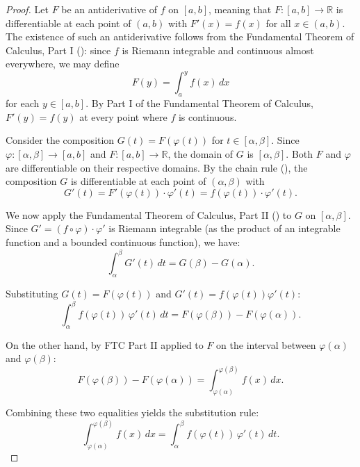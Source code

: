 \begin{proof}
    Let $F$ be an antiderivative of $f$ on $[a, b]$, meaning that $F : [a, b] \to \mathbb{R}$ is differentiable at each point of $(a, b)$ with $F'(x) = f(x)$ for all $x \in (a, b)$. The existence of such an antiderivative follows from the Fundamental Theorem of Calculus, Part I (): since $f$ is Riemann integrable and continuous almost everywhere, we may define
    $$F(y) = \int_a^y f(x)\,dx$$
    for each $y \in [a, b]$. By Part I of the Fundamental Theorem of Calculus, $F'(y) = f(y)$ at every point where $f$ is continuous.

    Consider the composition $G(t) = F(\varphi(t))$ for $t \in [\alpha, \beta]$. Since $\varphi : [\alpha, \beta] \to [a, b]$ and $F : [a, b] \to \mathbb{R}$, the domain of $G$ is $[\alpha, \beta]$. Both $F$ and $\varphi$ are differentiable on their respective domains. By the chain rule (), the composition $G$ is differentiable at each point of $(\alpha, \beta)$ with
    $$G'(t) = F'(\varphi(t)) \cdot \varphi'(t) = f(\varphi(t)) \cdot \varphi'(t).$$

    We now apply the Fundamental Theorem of Calculus, Part II () to $G$ on $[\alpha, \beta]$. Since $G' = (f \circ \varphi) \cdot \varphi'$ is Riemann integrable (as the product of an integrable function and a bounded continuous function), we have:
    $$\int_\alpha^\beta G'(t)\,dt = G(\beta) - G(\alpha).$$

    Substituting $G(t) = F(\varphi(t))$ and $G'(t) = f(\varphi(t))\varphi'(t)$:
    $$\int_\alpha^\beta f(\varphi(t))\,\varphi'(t)\,dt = F(\varphi(\beta)) - F(\varphi(\alpha)).$$

    On the other hand, by FTC Part II applied to $F$ on the interval between $\varphi(\alpha)$ and $\varphi(\beta)$:
    $$F(\varphi(\beta)) - F(\varphi(\alpha)) = \int_{\varphi(\alpha)}^{\varphi(\beta)} f(x)\,dx.$$

    Combining these two equalities yields the substitution rule:
    $$\int_{\varphi(\alpha)}^{\varphi(\beta)} f(x)\,dx = \int_\alpha^\beta f(\varphi(t))\,\varphi'(t)\,dt.$$
\end{proof}
